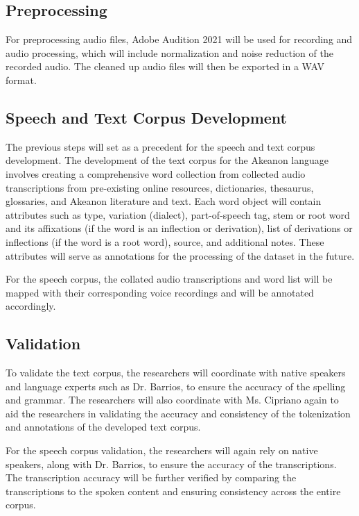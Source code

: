 \subsection{Preprocessing}
For preprocessing audio files, Adobe Audition 2021 will be used for recording and audio processing, which will include normalization and noise reduction of the recorded audio. The cleaned up audio files will then be exported in a WAV format.

\subsection{Speech and Text Corpus Development}
The previous steps will set as a precedent for the speech and text corpus development. The development of the text corpus for the Akeanon language involves creating a comprehensive word collection from collected audio transcriptions from pre-existing online resources, dictionaries, thesaurus, glossaries, and Akeanon literature and text. Each word object will contain attributes such as type, variation (dialect), part-of-speech tag, stem or root word and its affixations (if the word is an inflection or derivation), list of derivations or inflections (if the word is a root word), source, and additional notes. These attributes will serve as annotations for the processing of the dataset in the future.

For the speech corpus, the collated audio transcriptions and word list will be mapped with their corresponding voice recordings and will be annotated accordingly.

\subsection{Validation}

To validate the text corpus, the researchers will coordinate with native speakers and language experts such as Dr. Barrios, to ensure the accuracy of the spelling and grammar. The researchers will also coordinate with Ms. Cipriano again to aid the researchers in validating the accuracy and consistency of the tokenization and annotations of the developed text corpus.

For the speech corpus validation, the researchers will again rely on native speakers, along with Dr. Barrios, to ensure the accuracy of the transcriptions. The transcription accuracy will be further verified by comparing the transcriptions to the spoken content and ensuring consistency across the entire corpus.

